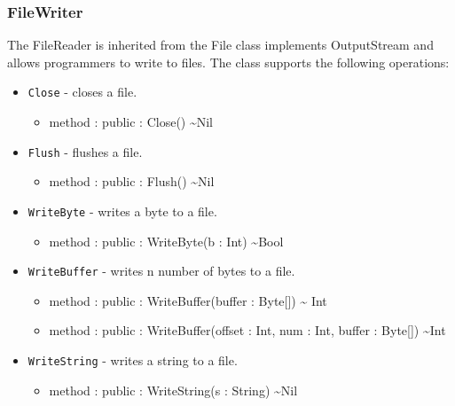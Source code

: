 \documentclass[11pt]{article}
\begin{document}
\subsubsection{FileWriter}
The FileReader is inherited from the File class implements
OutputStream and allows programmers to write to files.  The class
supports the following operations:
\begin{itemize}
\item \texttt{Close} - closes a file.
  \begin{itemize}
  \item method : public : Close() \textasciitilde Nil
  \end{itemize}
\item \texttt{Flush} - flushes a file.
  \begin{itemize}
  \item method : public : Flush() \textasciitilde Nil
  \end{itemize}
\item \texttt{WriteByte} - writes a byte to a file.
  \begin{itemize}
  \item method : public : WriteByte(b : Int) \textasciitilde Bool
  \end{itemize}
\item \texttt{WriteBuffer} - writes n number of bytes to a file.
  \begin{itemize}
  \item method : public : WriteBuffer(buffer : Byte[]) \textasciitilde
    Int
  \item method : public : WriteBuffer(offset : Int, num : Int, buffer
    : Byte[]) \textasciitilde Int
  \end{itemize}
\item \texttt{WriteString} - writes a string to a file.
  \begin{itemize}
  \item method : public : WriteString(s : String) \textasciitilde Nil
  \end{itemize}
\end{itemize}
\end{document}
